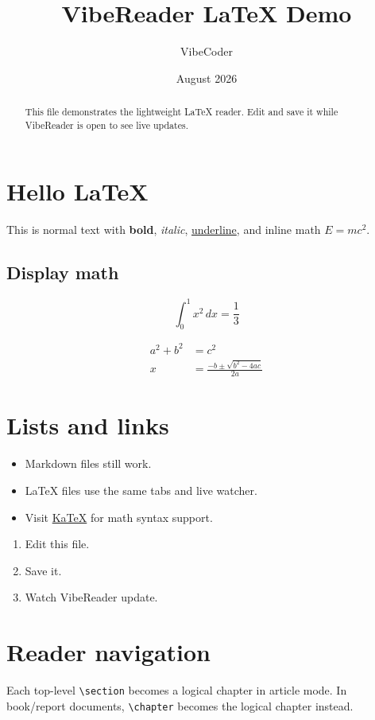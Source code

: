 \documentclass{article}
\title{VibeReader LaTeX Demo}
\author{VibeCoder}
\date{August 2026}
\begin{document}
\maketitle

\begin{abstract}
This file demonstrates the lightweight LaTeX reader. Edit and save it while VibeReader is open to see live updates.
\end{abstract}

\section{Hello LaTeX}
This is normal text with \textbf{bold}, \textit{italic}, \underline{underline}, and inline math $E = mc^2$.

\subsection{Display math}
\[
\int_0^1 x^2\,dx = \frac{1}{3}
\]

\begin{align}
a^2 + b^2 &= c^2 \\
x &= \frac{-b \pm \sqrt{b^2 - 4ac}}{2a}
\end{align}

\section{Lists and links}
\begin{itemize}
\item Markdown files still work.
\item LaTeX files use the same tabs and live watcher.
\item Visit \href{https://katex.org}{KaTeX} for math syntax support.
\end{itemize}

\begin{enumerate}
\item Edit this file.
\item Save it.
\item Watch VibeReader update.
\end{enumerate}

\section{Reader navigation}
Each top-level \texttt{\textbackslash section} becomes a logical chapter in article mode. In book/report documents, \texttt{\textbackslash chapter} becomes the logical chapter instead.
\end{document}

